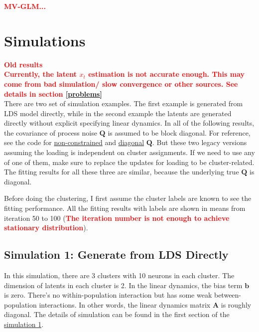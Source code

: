 \documentclass[]{article}
\begin{document}
\textcolor{red}{\textbf{MV-GLM...}}\\

\section{Simulations}

\textcolor{red}{\textbf{Old results}}\\

\textcolor{red}{\textbf{Currently, the latent \(x_t\) estimation is not accurate enough. This may come from bad simulation/ slow convergence or other sources. See details in section \ref{problems}}}\\

There are two set of simulation examples. The first example is generated from LDS model directly, while in the second example the latents are generated directly without explicit specifying linear dynamics. In all of the following results, the covariance of process noise \(\mathbf{Q}\) is assumed to be block diagonal. For reference, see the code for \href{https://github.com/weigcdsb/state-space-clustering/blob/main/LDS/old_example/sim_LDS_noConstraint.m}{non-constrained} and \href{https://github.com/weigcdsb/state-space-clustering/blob/main/LDS/old_example/sim_LDS_diag.m}{diagonal} \(\mathbf{Q}\). But these two legacy versions assuming the loading is independent on cluster assignments. If we need to use any of one of them, make sure to replace the updates for loading to be cluster-related. The fitting results for all these three are similar, because the underlying true \(\mathbf{Q}\) is diagonal.

Before doing the clustering, I first assume the cluster labels are known to see the fitting performance. All the fitting results with labels are shown in means from iteration 50 to 100 (\textcolor{red}{\textbf{The iteration number is not enough to achieve stationary distribution}}).

\subsection{Simulation 1: Generate from LDS Directly}
In this simulation, there are 3 clusters with 10 neurons in each cluster. The dimension of latents in each cluster is 2. In the linear dynamics, the bias term \(\mathbf{b}\) is zero. There's no within-population interaction but has some weak between-population interactions. In other words, the linear dynamics matrix \(\mathbf{A}\) is roughly diagonal. The details of simulation can be found in the first section of the \href{https://github.com/weigcdsb/state-space-clustering/blob/main/LDS/lds_sample.m}{simulation 1}.
\end{document}
